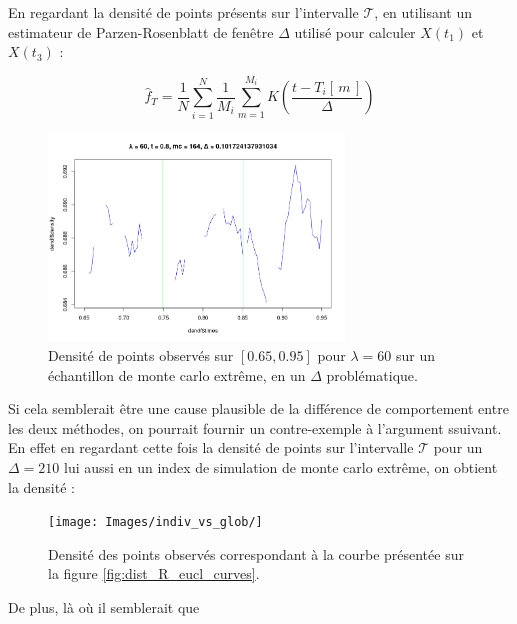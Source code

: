 En regardant la densité de points présents sur l'intervalle $\mathcal T$, en utilisant un estimateur de Parzen-Rosenblatt de fenêtre $\Delta$ utilisé pour calculer $X(t_1)$ et $X(t_3)$ :

\begin{equation*}
	\widehat f_T = \frac 1 N \sum\limits_{i=1}^N \frac 1 {M_i} \sum\limits_{m=1}^{M_i} K\left( \frac{t - T_i[\, m \, ]}{\Delta} \right)
\end{equation*}



\begin{figure}[H]
	\centering
	\includegraphics[width=0.7\textwidth]{Images/indiv_vs_glob/Tdensity_lbd60_mc164.png}
	\caption{Densité de points observés sur $[0.65, 0.95]$ pour $\lambda = 60$ sur un échantillon de monte carlo extrême, en un $\Delta$ problématique.}
	\label{fig:den_ex}
\end{figure}

Si cela semblerait être une cause plausible de la différence de comportement entre les deux méthodes, on pourrait fournir un contre-exemple à l'argument ssuivant. En effet en regardant cette fois la densité de points sur l'intervalle $\mathcal T$ pour un $\Delta=210$ lui aussi en un index de simulation de monte carlo extrême, on obtient la densité :

\begin{figure}[H]
	\centering
	\texttt{[image: Images/indiv\_vs\_glob/]}
	\caption{Densité des points observés correspondant à la courbe présentée sur la figure \ref{fig:dist_R_eucl_curves}.}
	\label{fig:den_counterex}
\end{figure}

De plus, là où il semblerait que